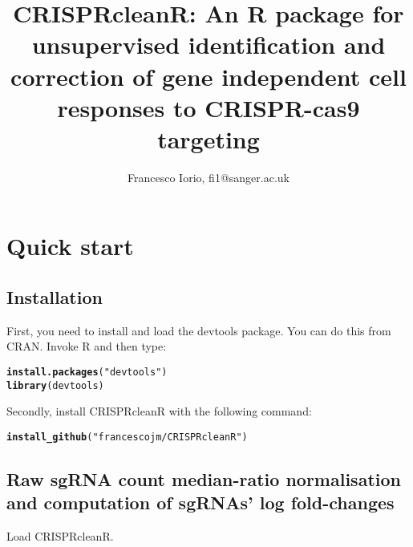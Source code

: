 \documentclass{article}\usepackage[]{graphicx}\usepackage[]{color}
\makeatletter
\newcommand{\hlstr}[1]{\textcolor[rgb]{0.192,0.494,0.8}{#1}}%
\newcommand{\hlstd}[1]{\textcolor[rgb]{0.345,0.345,0.345}{#1}}%
\newcommand{\hlkwd}[1]{\textcolor[rgb]{0.737,0.353,0.396}{\textbf{#1}}}%
\newenvironment{kframe}{%
 \def\at@end@of@kframe{}%
 \ifinner\ifhmode%
  \def\at@end@of@kframe{\end{minipage}}%
  \begin{minipage}{\columnwidth}%
 \fi\fi%
 \def\FrameCommand##1{\hskip\@totalleftmargin \hskip-\fboxsep
 \colorbox{shadecolor}{##1}\hskip-\fboxsep
     \hskip-\linewidth \hskip-\@totalleftmargin \hskip\columnwidth}%
 \MakeFramed {\advance\hsize-\width
   \@totalleftmargin\z@ \linewidth\hsize
   \@setminipage}}%
 {\par\unskip\endMakeFramed%
 \at@end@of@kframe}
\newenvironment{knitrout}{}{} %
\makeatother
\begin{document}
\title{CRISPRcleanR: An R package for unsupervised identification and correction of gene independent cell responses to CRISPR-cas9 targeting}
\author{Francesco Iorio, fi1@sanger.ac.uk}
\maketitle
\section{Quick start}

\subsection{Installation}
 
First, you need to install and load the devtools package. You can do this from CRAN. Invoke R and then type:
 
\begin{knitrout}
\color{fgcolor}\begin{kframe}
\begin{alltt}
\hlkwd{install.packages}\hlstd{(}\hlstr{"devtools"}\hlstd{)}
\hlkwd{library}\hlstd{(devtools)}
\end{alltt}
\end{kframe}
\end{knitrout}

Secondly, install CRISPRcleanR with the following command:

\begin{knitrout}
\color{fgcolor}\begin{kframe}
\begin{alltt}
\hlkwd{install_github}\hlstd{(}\hlstr{"francescojm/CRISPRcleanR"}\hlstd{)}
\end{alltt}
\end{kframe}
\end{knitrout}

\subsection{Raw sgRNA count median-ratio normalisation and computation of sgRNAs' log fold-changes}
 
Load CRISPRcleanR.
\end{document}
